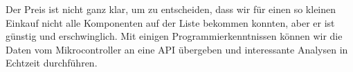\documentclass[12pt]{article}
\begin{document}
Der Preis ist nicht ganz klar, um zu entscheiden, dass wir für einen so kleinen Einkauf nicht alle Komponenten auf der Liste bekommen konnten, aber er ist günstig und erschwinglich. Mit einigen Programmierkenntnissen können wir die Daten vom Mikrocontroller an eine API übergeben und interessante Analysen in Echtzeit durchführen.

\newpage
\printbibliography
{}

\end{document}

